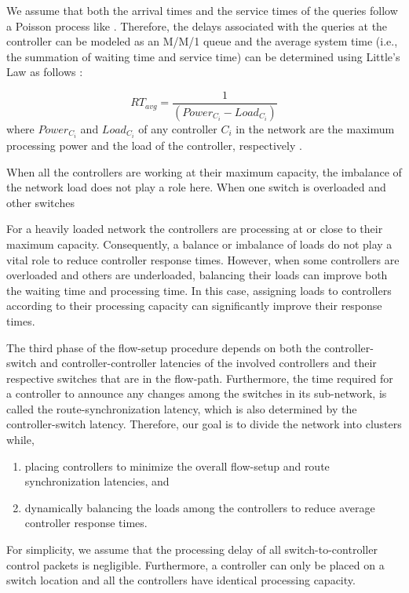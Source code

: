 \documentclass[final,5p,times]{cas-dc}
\begin{document}
	We assume that both the arrival times and the service times of the queries follow a Poisson process like \cite{wang2016load}. Therefore, the delays associated with the queries at the controller can be modeled as an M/M/1 queue and the average system time (i.e., the summation of waiting time and service time) can be determined using Little's Law as follows \cite{wang2016load}:
	
	\begin{equation} \label{eqn:cresponse}
	RT_{avg} = \frac{1}{(Power_{C_i} - Load_{C_i})}
	\end{equation}
	where $Power_{C_i}$ and $Load_{C_i}$ of any controller $C_i$ in the network are the maximum processing power and the load of the controller, respectively .
	
	When all the controllers are working at their maximum capacity, the imbalance of the network load does not play a role here. When one switch is overloaded and other switches
	
	For a heavily loaded network the controllers are processing at or close to their maximum capacity. Consequently, a balance or imbalance of loads do not play a vital role to reduce controller response times. However, when some controllers are overloaded and others are underloaded, balancing their loads can improve both the waiting time and processing time. In this case, assigning loads to controllers according to their processing capacity can significantly improve their response times.
	
	The third phase of the flow-setup procedure depends on both the controller-switch and controller-controller latencies of the involved controllers and their respective switches that are in the flow-path. Furthermore, the time required for a controller to announce any changes among the switches in its sub-network, is called the route-synchronization latency, which is also determined by the controller-switch latency. Therefore, our goal is to divide the network into clusters while,
	\begin{enumerate}
		\item placing controllers to minimize the overall flow-setup and route synchronization latencies, and
		\item dynamically balancing the loads among the controllers to reduce average controller response times.
	\end{enumerate}
	For simplicity, we assume that the processing delay of all switch-to-controller control packets is negligible. Furthermore, a controller can only be placed on a switch location and all the controllers have identical processing capacity.
	
\end{document}

